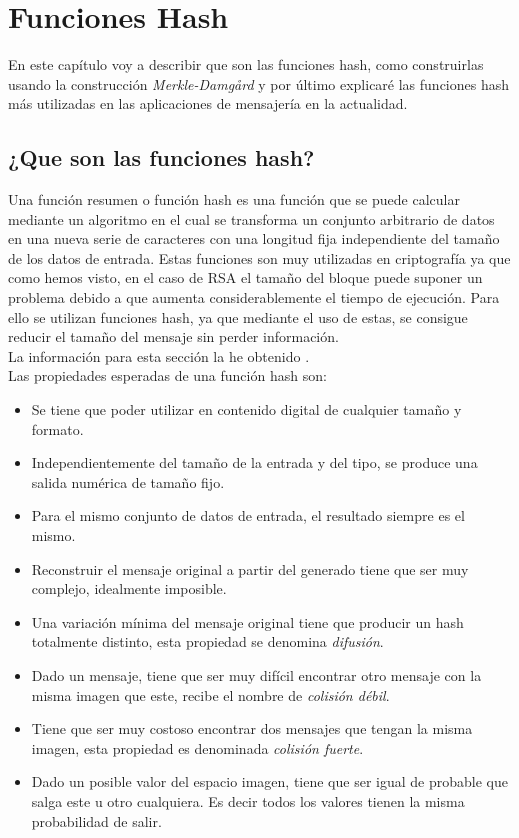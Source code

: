 \chapter{Funciones Hash}
En este capítulo voy a describir que son las funciones hash, como construirlas usando la construcción \emph{Merkle-Damgård} y por último explicaré las funciones hash más utilizadas en las aplicaciones de mensajería en la actualidad.
\section{¿Que son las funciones hash?}
Una función resumen o función hash es una función que se puede calcular mediante un algoritmo en el cual se transforma un conjunto arbitrario de datos en una nueva serie de caracteres con una longitud fija independiente del tamaño de los datos de entrada.
Estas funciones son muy utilizadas en criptografía ya que como hemos visto, en el caso de RSA el tamaño del bloque puede suponer un problema debido a que aumenta considerablemente el tiempo de ejecución.
Para ello se utilizan funciones hash, ya que mediante el uso de estas, se consigue reducir el tamaño del mensaje sin perder información.\\ La información para esta sección la he obtenido \cite{aepd}.\\

Las propiedades esperadas de una función hash son:
\begin{itemize}
	\item Se tiene que poder utilizar en contenido digital de cualquier tamaño y formato.
	\item Independientemente del tamaño de la entrada y del tipo, se produce una salida numérica de tamaño fijo.
	\item Para el mismo conjunto de datos de entrada, el resultado siempre es el mismo.
	\item Reconstruir el mensaje original a partir del generado tiene que ser muy complejo, idealmente imposible.
	\item Una variación mínima del mensaje original tiene que producir un hash totalmente distinto, esta propiedad se denomina \emph{difusión}.
	\item Dado un mensaje, tiene que ser muy difícil encontrar otro mensaje con la misma imagen que este, recibe el nombre de \emph{colisión débil}.
	\item Tiene que ser muy costoso encontrar dos mensajes que tengan la misma imagen, esta propiedad es denominada \emph{colisión fuerte}.
	\item Dado un posible valor del espacio imagen, tiene que ser igual de probable que salga este u otro cualquiera. Es decir todos los valores tienen la misma probabilidad de salir.
\end{itemize}

